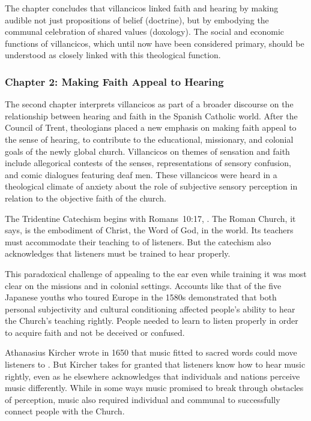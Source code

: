 \documentclass{vcbook-proposal}
\begin{document}
The chapter concludes that villancicos linked faith and hearing by making 
audible not just propositions of belief (doctrine), but by embodying the 
communal celebration of shared values (doxology).
The social and economic functions of villancicos, which until now have been 
considered primary, should be understood as closely linked with this 
theological function.


\subsubsection{Chapter 2: Making Faith Appeal to Hearing}

The second chapter interprets villancicos as part of a broader discourse on the 
relationship between hearing and faith in the Spanish Catholic world.
After the Council of Trent, theologians placed a new emphasis on making faith 
appeal to the sense of hearing, to contribute to the educational, missionary, 
and colonial goals of the newly global church.
Villancicos on themes of sensation and faith include allegorical contests of 
the senses, representations of sensory confusion, and comic dialogues featuring 
deaf men.
These villancicos were heard in a theological climate of anxiety about the role 
of subjective sensory perception in relation to the objective faith of the 
church.

The Tridentine Catechism begins with Romans~10:17, .%
  \autocite{Catholic:Catechismus1614}
The Roman Church, it says, is the embodiment of Christ, the Word of God, in the 
world.
Its teachers must accommodate their teaching to  of listeners.
But the catechism also acknowledges that listeners must be trained to hear 
properly.

This paradoxical challenge of appealing to the ear even while training it was 
most clear on the missions and in colonial settings.
Accounts like that of the five Japanese youths who toured Europe in the 1580s 
demonstrated that both personal subjectivity and cultural conditioning affected 
people's ability to hear the Church's teaching rightly.%
  \autocite{Massarella:JapaneseTravellers}
People needed to learn to listen properly in order to acquire faith and not be 
deceived or confused.

Athanasius Kircher wrote in 1650 that music fitted to sacred words could move 
listeners to .%
  \autocite{Kircher:Musurgia}
But Kircher takes for granted that listeners know how to hear music rightly, 
even as he elsewhere acknowledges that individuals and nations perceive music 
differently.
While in some ways music promised to break through obstacles of perception, 
music also required individual and communal  to 
successfully connect people with the Church.
\end{document}
